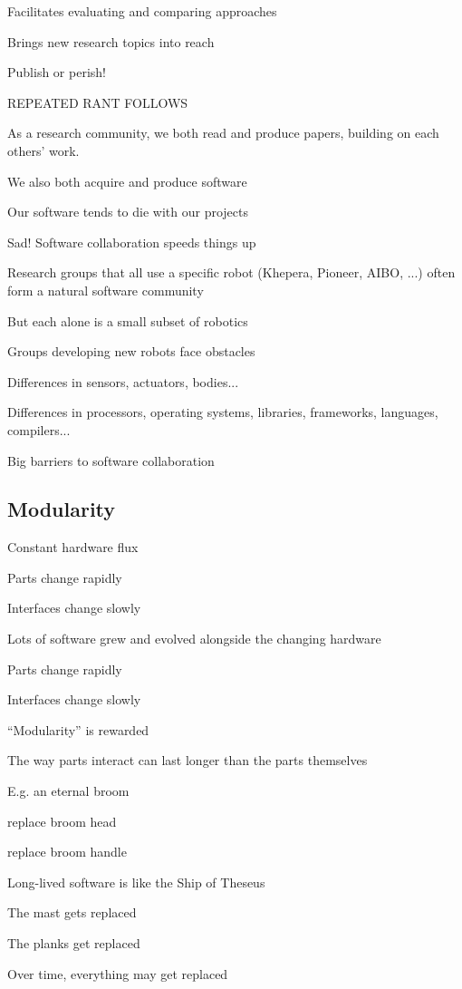 Facilitates evaluating and comparing approaches

Brings new research topics into reach

Publish or perish!

REPEATED RANT FOLLOWS

As a research community, we both read and produce papers, building on
each others' work.

We also both acquire and produce software

Our software tends to die with our projects

Sad!  Software collaboration speeds things up

Research groups that all use a specific robot (Khepera, Pioneer, AIBO,
...) often form a natural software community

But each alone is a small subset of robotics

Groups developing new robots face obstacles

Differences in sensors, actuators, bodies...

Differences in processors, operating systems, libraries, frameworks,
languages, compilers...

Big barriers to software collaboration




\subsection*{Modularity}

Constant hardware flux

Parts change rapidly

Interfaces change slowly

Lots of software grew and evolved alongside the changing hardware

Parts change rapidly

Interfaces change slowly

``Modularity'' is rewarded


The way parts interact can last longer than the parts themselves

E.g. an eternal broom

replace broom head

replace broom handle


Long-lived software is like the Ship of Theseus

The mast gets replaced

The planks get replaced

Over time, everything may get replaced

